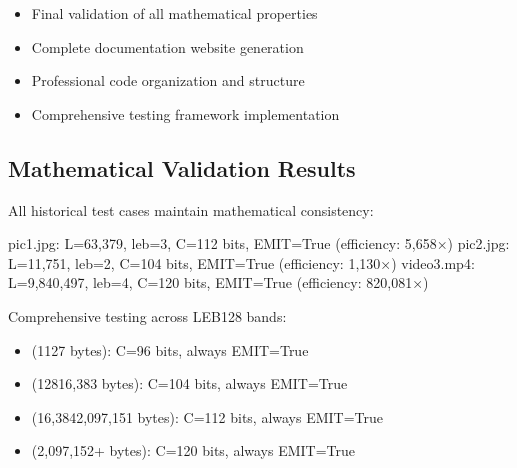 \documentclass[letterpaper,10pt,english]{sphinxmanual}
\begin{document}
\sphinxAtStartPar
{}

\sphinxAtStartPar
{}
\begin{itemize}
\item {} 
\sphinxAtStartPar
Final validation of all mathematical properties

\item {} 
\sphinxAtStartPar
Complete documentation website generation

\item {} 
\sphinxAtStartPar
Professional code organization and structure

\item {} 
\sphinxAtStartPar
Comprehensive testing framework implementation

\end{itemize}


\subsection{Mathematical Validation Results}
\label{\detokenize{changelog:mathematical-validation-results}}
\sphinxAtStartPar
{}

\sphinxAtStartPar
All historical test cases maintain mathematical consistency:

\begin{sphinxVerbatim}[commandchars=\\\{\}]
pic1.jpg: L=63,379, leb=3, C=112 bits, EMIT=True (efficiency: 5,658×)
pic2.jpg: L=11,751, leb=2, C=104 bits, EMIT=True (efficiency: 1,130×)
video3.mp4: L=9,840,497, leb=4, C=120 bits, EMIT=True (efficiency: 820,081×)
\end{sphinxVerbatim}

\sphinxAtStartPar
{}

\sphinxAtStartPar
Comprehensive testing across LEB128 bands:
\begin{itemize}
\item {} 
\sphinxAtStartPar
{} (1\sphinxhyphen{}127 bytes): C=96 bits, always EMIT=True

\item {} 
\sphinxAtStartPar
{} (128\sphinxhyphen{}16,383 bytes): C=104 bits, always EMIT=True

\item {} 
\sphinxAtStartPar
{} (16,384\sphinxhyphen{}2,097,151 bytes): C=112 bits, always EMIT=True

\item {} 
\sphinxAtStartPar
{} (2,097,152+ bytes): C=120 bits, always EMIT=True

\end{itemize}
\end{document}
